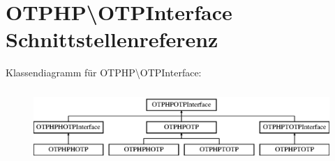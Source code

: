 \hypertarget{interface_o_t_p_h_p_1_1_o_t_p_interface}{}\section{O\+T\+P\+HP\textbackslash{}O\+T\+P\+Interface Schnittstellenreferenz}
\label{interface_o_t_p_h_p_1_1_o_t_p_interface}
Klassendiagramm für O\+T\+P\+HP\textbackslash{}O\+T\+P\+Interface\+:\begin{figure}[H]
\begin{center}
\leavevmode
\includegraphics[height=2.800000cm]{interface_o_t_p_h_p_1_1_o_t_p_interface}
\end{center}
\end{figure}

